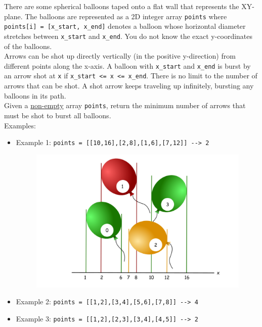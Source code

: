There are some spherical balloons taped onto a flat wall that represents the XY-plane. The balloons are represented as a 2D integer array {\colorbox{CodeBackground}{\lstinline|points|}} where {\colorbox{CodeBackground}{\lstinline|points[i] = [x_start, x_end]|}} denotes a balloon whose horizontal diameter stretches between {\colorbox{CodeBackground}{\lstinline|x_start|}} and {\colorbox{CodeBackground}{\lstinline|x_end|}}. You do not know the exact y-coordinates of the balloons.\\

Arrows can be shot up directly vertically (in the positive y-direction) from different points along the x-axis. A balloon with {\colorbox{CodeBackground}{\lstinline|x_start|}} and {\colorbox{CodeBackground}{\lstinline|x_end|}} is burst by an arrow shot at {\colorbox{CodeBackground}{\lstinline|x|}} if {\colorbox{CodeBackground}{\lstinline|x_start <= x <= x_end|}}. There is no limit to the number of arrows that can be shot. A shot arrow keeps traveling up infinitely, bursting any balloons in its path.\\

Given a \ul{non-empty} array {\colorbox{CodeBackground}{\lstinline|points|}}, return the minimum number of arrows that must be shot to burst all balloons.\\

Examples:
\begin{itemize}
\item Example 1: {\colorbox{CodeBackground}{\lstinline|points = [[10,16],[2,8],[1,6],[7,12]] --> 2|}}
\begin{figure}[H]
\centering
\includegraphics[width=0.5\linewidth]{images/lc0452_eg}
\end{figure}
\item Example 2: {\colorbox{CodeBackground}{\lstinline|points = [[1,2],[3,4],[5,6],[7,8]] --> 4|}}
\item Example 3: {\colorbox{CodeBackground}{\lstinline|points = [[1,2],[2,3],[3,4],[4,5]] --> 2|}}
\end{itemize}

